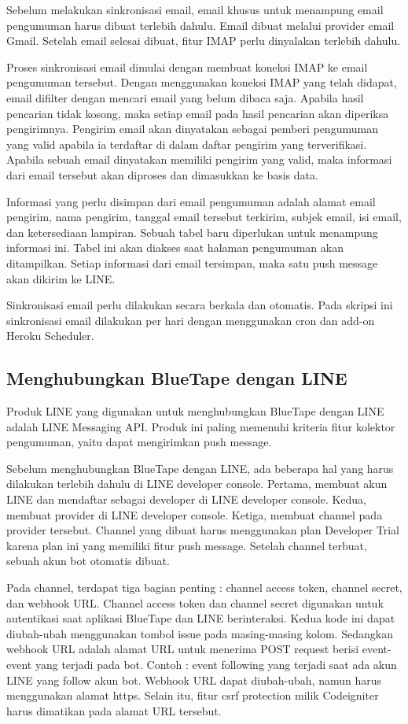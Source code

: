 	Sebelum melakukan sinkronisasi email, email khusus untuk menampung email pengumuman harus dibuat terlebih dahulu. Email dibuat melalui provider email Gmail. Setelah email selesai dibuat, fitur IMAP perlu dinyalakan terlebih dahulu.
	
	Proses sinkronisasi email dimulai dengan membuat koneksi IMAP ke email pengumuman tersebut. Dengan menggunakan koneksi IMAP yang telah didapat, email difilter dengan mencari email yang belum dibaca saja. Apabila hasil pencarian tidak kosong, maka setiap email pada hasil pencarian akan diperiksa pengirimnya. Pengirim email akan dinyatakan sebagai pemberi pengumuman yang valid apabila ia terdaftar di dalam daftar pengirim yang terverifikasi. Apabila sebuah email dinyatakan memiliki pengirim yang valid, maka informasi dari email tersebut akan diproses dan dimasukkan ke basis data.
	
	Informasi yang perlu disimpan dari email pengumuman adalah alamat email pengirim, nama pengirim, tanggal email tersebut terkirim, subjek email, isi email, dan ketersediaan lampiran. Sebuah tabel baru diperlukan untuk menampung informasi ini. Tabel ini akan diakses saat halaman pengumuman akan ditampilkan. Setiap informasi dari email tersimpan, maka satu push message akan dikirim ke LINE.
	
	Sinkronisasi email perlu dilakukan secara berkala dan otomatis. Pada skripsi ini sinkronisasi email dilakukan per hari dengan menggunakan cron dan add-on Heroku Scheduler.
	
\subsection{Menghubungkan BlueTape dengan LINE}
\label{sec:analisisline}
	Produk LINE yang digunakan untuk menghubungkan BlueTape dengan LINE adalah LINE Messaging API. Produk ini paling memenuhi kriteria fitur kolektor pengumuman, yaitu dapat mengirimkan push message.
	
	Sebelum menghubungkan BlueTape dengan LINE, ada beberapa hal yang harus dilakukan terlebih dahulu di LINE developer console. Pertama, membuat akun LINE dan mendaftar sebagai developer di LINE developer console. Kedua, membuat provider di LINE developer console. Ketiga, membuat channel pada provider tersebut. Channel yang dibuat harus menggunakan plan Developer Trial karena plan ini yang memiliki fitur push message. Setelah channel terbuat, sebuah akun bot otomatis dibuat.
	
	Pada channel, terdapat tiga bagian penting : channel access token, channel secret, dan webhook URL. Channel access token dan channel secret digunakan untuk autentikasi saat aplikasi BlueTape dan LINE berinteraksi. Kedua kode ini dapat diubah-ubah menggunakan tombol issue pada masing-masing kolom. Sedangkan webhook URL adalah alamat URL untuk menerima POST request berisi event-event yang terjadi pada bot. Contoh : event following yang terjadi saat ada akun LINE yang follow akun bot. Webhook URL dapat diubah-ubah, namun harus menggunakan alamat https. Selain itu, fitur csrf protection milik Codeigniter harus dimatikan pada alamat URL tersebut.
	

